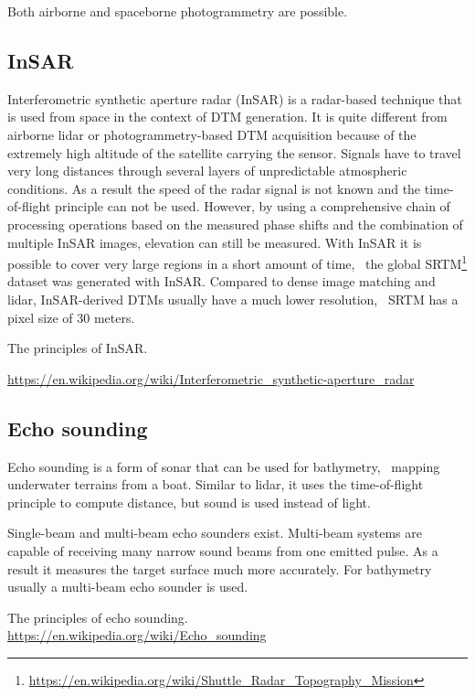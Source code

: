 Both airborne and spaceborne photogrammetry are possible.

\subsection{InSAR}
Interferometric synthetic aperture radar (InSAR) is a radar-based technique that is used from space in the context of DTM generation. 
It is quite different from airborne lidar or photo\-gramme\-try-based DTM acquisition because of the extremely high altitude of the satellite carrying the sensor. 
Signals have to travel very long distances through several layers of unpredictable atmospheric conditions. 
As a result the speed of the radar signal is not known and the time-of-flight principle can not be used. 
However, by using a comprehensive chain of processing operations based on the measured phase shifts and the combination of multiple InSAR images, elevation can still be measured. 
With InSAR it is possible to cover very large regions in a short amount of time, \eg\ the global SRTM\footnote{\url{https://en.wikipedia.org/wiki/Shuttle_Radar_Topography_Mission}} dataset was generated with InSAR\@. 
Compared to dense image matching and lidar, InSAR-derived DTMs usually have a much lower resolution, \eg\ SRTM has a pixel size of 30 meters.

\begin{link-box}
The principles of InSAR\@.

\url{https://en.wikipedia.org/wiki/Interferometric_synthetic-aperture_radar}
\end{link-box}

\subsection{Echo sounding}
\label{sec:mbes}
Echo sounding is a form of sonar that can be used for bathymetry, \ie\ mapping underwater terrains from a boat. 
Similar to lidar, it uses the time-of-flight principle to compute distance, but sound is used instead of light. 

Single-beam and multi-beam echo sounders exist. Multi-beam systems are capable of receiving many narrow sound beams from one emitted pulse. As a result it measures the target surface much more accurately. 
For bathymetry usually a multi-beam echo sounder is used.

\begin{link-box}
  The principles of echo sounding.
  \\
  \url{https://en.wikipedia.org/wiki/Echo_sounding}
\end{link-box}




